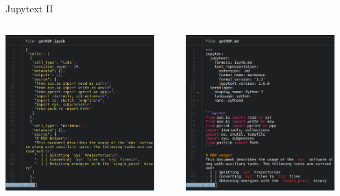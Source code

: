 \documentclass[bigger,unknownkeysallowed,aspectratio=169,red,colorblocks]{beamer}
\begin{document}
\begin{frame}[label={sec:orgf4631c4}]{Jupytext II}
\begin{columns}
\begin{column}{0.5\columnwidth}
\begin{center}
\includegraphics[width=0.9\textwidth]{images/A_screenshot/2020-09-20_09-01-21_screenshot.png}
\end{center}
\end{column}

\begin{column}{0.5\columnwidth}
\begin{center}
\includegraphics[width=0.9\textwidth]{images/A_screenshot/2020-09-20_09-01-40_screenshot.png}
\end{center}
\end{column}
\end{columns}
\end{frame}
\end{document}
